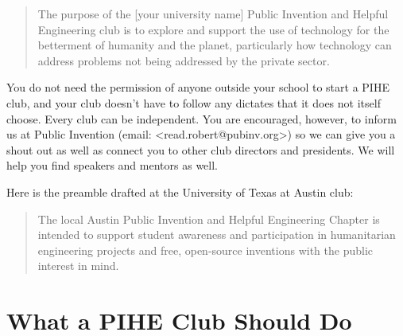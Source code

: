 \documentclass[
	fontsize=10pt, %
	twoside=false, %
	secnumdepth=1, %
]{kaobook}
\begin{document}
\blockquote{
The purpose of the [your university name] Public Invention and Helpful Engineering club is to explore and support the use of technology for the betterment of humanity and the planet, particularly how technology can address problems not being addressed by the private sector.
}

You do not need the permission of anyone outside your school to start a PIHE club, and your club doesn’t have to follow any dictates that it does not itself choose. Every club can be independent. You are encouraged, however, to inform us at Public Invention (email: <read.robert@pubinv.org>)  so we can give you a shout out as well as connect you to other club directors and presidents. We will help you find speakers and mentors as well.

Here is the preamble drafted at the University of Texas at Austin club:
\blockquote{
The local Austin Public Invention and Helpful Engineering Chapter is intended to support student awareness and participation in humanitarian engineering projects and free, open-source inventions with the public interest in mind.
}

\section{What a PIHE Club Should Do}
\end{document}
